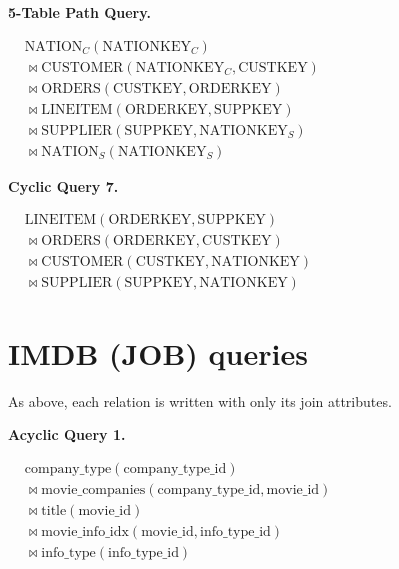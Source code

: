 \medskip
\noindent\textbf{5-Table Path Query.}

\noindent$\displaystyle
\begin{aligned}
& \mathrm{NATION}_C(\mathrm{NATIONKEY}_C) \\
& {} \bowtie \mathrm{CUSTOMER}(\mathrm{NATIONKEY}_C, \mathrm{CUSTKEY}) \\
& {} \bowtie \mathrm{ORDERS}(\mathrm{CUSTKEY}, \mathrm{ORDERKEY}) \\
& {} \bowtie \mathrm{LINEITEM}(\mathrm{ORDERKEY}, \mathrm{SUPPKEY}) \\
& {} \bowtie \mathrm{SUPPLIER}(\mathrm{SUPPKEY}, \mathrm{NATIONKEY}_S) \\
& {} \bowtie \mathrm{NATION}_S(\mathrm{NATIONKEY}_S)
\end{aligned}$

\medskip
\noindent\textbf{Cyclic Query 7.}

\noindent$\displaystyle
\begin{aligned}
& \mathrm{LINEITEM}(\mathrm{ORDERKEY}, \mathrm{SUPPKEY}) \\
& {} \bowtie \mathrm{ORDERS}(\mathrm{ORDERKEY}, \mathrm{CUSTKEY}) \\
& {} \bowtie \mathrm{CUSTOMER}(\mathrm{CUSTKEY}, \mathrm{NATIONKEY}) \\
& {} \bowtie \mathrm{SUPPLIER}(\mathrm{SUPPKEY}, \mathrm{NATIONKEY})
\end{aligned}$

\section{IMDB (JOB) queries}
\label{app:queries_imdb}

As above, each relation is written with only its join attributes.

\medskip
\noindent\textbf{Acyclic Query 1.}

\noindent$\displaystyle
\begin{aligned}
& \mathrm{company\_type}(\mathrm{company\_type\_id}) \\
& {} \bowtie \mathrm{movie\_companies}(\mathrm{company\_type\_id}, \mathrm{movie\_id}) \\
& {} \bowtie \mathrm{title}(\mathrm{movie\_id}) \\
& {} \bowtie \mathrm{movie\_info\_idx}(\mathrm{movie\_id}, \mathrm{info\_type\_id}) \\
& {} \bowtie \mathrm{info\_type}(\mathrm{info\_type\_id})
\end{aligned}$

